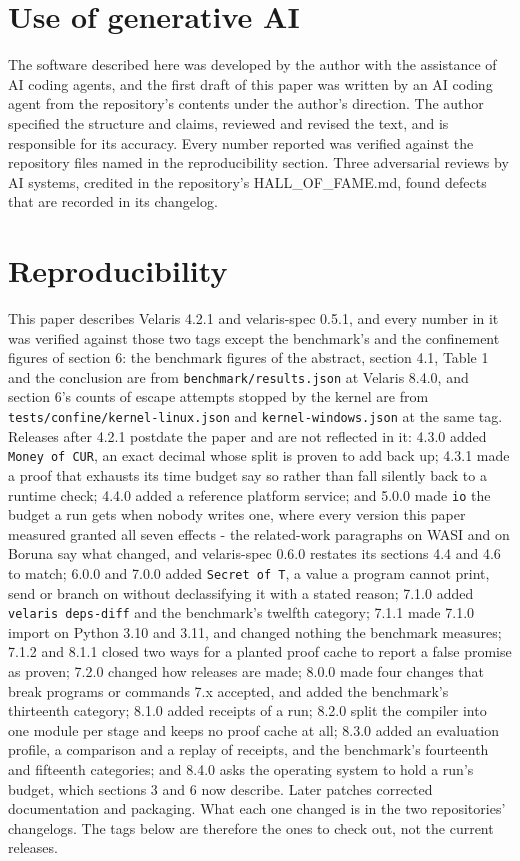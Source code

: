 \documentclass[
]{article}
\begin{document}
\section{Use of generative AI}\label{use-of-generative-ai}

The software described here was developed by the author with the
assistance of AI coding agents, and the first draft of this paper was
written by an AI coding agent from the repository's contents under the
author's direction. The author specified the structure and claims,
reviewed and revised the text, and is responsible for its accuracy.
Every number reported was verified against the repository files named in
the reproducibility section. Three adversarial reviews by AI systems,
credited in the repository's HALL\_OF\_FAME.md, found defects that are
recorded in its changelog.

\section{Reproducibility}\label{reproducibility}

This paper describes Velaris 4.2.1 and velaris-spec 0.5.1, and every
number in it was verified against those two tags except the benchmark's
and the confinement figures of section 6: the benchmark figures of the
abstract, section 4.1, Table 1 and the conclusion are from
\texttt{benchmark/results.json} at Velaris 8.4.0, and section 6's counts
of escape attempts stopped by the kernel are from
\texttt{tests/confine/kernel-linux.json} and
\texttt{kernel-windows.json} at the same tag. Releases after 4.2.1
postdate the paper and are not reflected in it: 4.3.0 added
\texttt{Money\ of\ CUR}, an exact decimal whose split is proven to add
back up; 4.3.1 made a proof that exhausts its time budget say so rather
than fall silently back to a runtime check; 4.4.0 added a reference
platform service; and 5.0.0 made \texttt{io} the budget a run gets when
nobody writes one, where every version this paper measured granted all
seven effects - the related-work paragraphs on WASI and on Boruna say
what changed, and velaris-spec 0.6.0 restates its sections 4.4 and 4.6
to match; 6.0.0 and 7.0.0 added \texttt{Secret\ of\ T}, a value a
program cannot print, send or branch on without declassifying it with a
stated reason; 7.1.0 added \texttt{velaris\ deps-diff} and the
benchmark's twelfth category; 7.1.1 made 7.1.0 import on Python 3.10 and
3.11, and changed nothing the benchmark measures; 7.1.2 and 8.1.1 closed
two ways for a planted proof cache to report a false promise as proven;
7.2.0 changed how releases are made; 8.0.0 made four changes that break
programs or commands 7.x accepted, and added the benchmark's thirteenth
category; 8.1.0 added receipts of a run; 8.2.0 split the compiler into
one module per stage and keeps no proof cache at all; 8.3.0 added an
evaluation profile, a comparison and a replay of receipts, and the
benchmark's fourteenth and fifteenth categories; and 8.4.0 asks the
operating system to hold a run's budget, which sections 3 and 6 now
describe. Later patches corrected documentation and packaging. What each
one changed is in the two repositories' changelogs. The tags below are
therefore the ones to check out, not the current releases.
\end{document}
